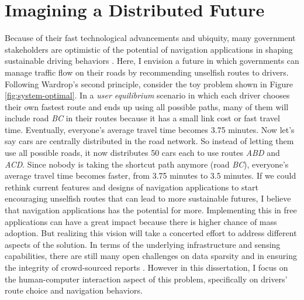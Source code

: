 \section{Imagining a Distributed Future}
Because of their fast technological advancements and ubiquity, many government stakeholders are optimistic of the potential of navigation applications in shaping sustainable driving behaviors \cite{Attard2016TheSystems}. Here, I envision a future in which governments can manage traffic flow on their roads by recommending unselfish routes to drivers. Following Wardrop's second principle\cite{wardrop1952road}, consider the toy problem shown in Figure \ref{fig:system-optimal}. In a \textit{user equilibrium} scenario in which each driver chooses their own fastest route and ends up using all possible paths, many of them will include road \textit{BC} in their routes because it has a small link cost or fast travel time. Eventually, everyone's average travel time becomes 3.75 minutes. Now let’s say cars are centrally distributed in the road network. So instead of letting them use all possible roads, it now distributes 50 cars each to use routes \textit{ABD} and \textit{ACD}. Since nobody is taking the shortcut path anymore (road \textit{BC}), everyone’s average travel time becomes faster, from 3.75 minutes to 3.5 minutes. If we could rethink current features and designs of navigation applications to start encouraging unselfish routes that can lead to more sustainable futures, I believe that navigation applications has the potential for more. Implementing this in free applications can have a great impact because there is higher chance of mass adoption. But realizing this vision will take a concerted effort to address different aspects of the solution. In terms of the underlying infrastructure and sensing capabilities, there are still many open challenges on data sparsity and in ensuring the integrity of crowd-sourced reports \cite{Silva2016UsersOpportunities,QingYang2015TowardNetworks,Vyroubal2016MobileSystems}. However in this dissertation, I focus on the human-computer interaction aspect of this problem, specifically on drivers' route choice and navigation behaviors. 

